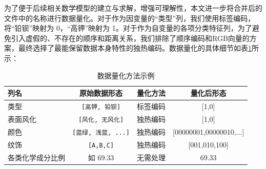 为了便于后续相关数学模型的建立与求解，增强可理解性，本文进一步将合并后的文件中的名称进行数据量化。对于作为因变量的“类型”列，我们使用标签编码，将“铅钡”映射为 0，“高钾”映射为 1。对于作为自变量的各项分类特征列，为了避免引入虚假的、不存在的顺序和距离关系，我们排除了顺序编码和RGB向量的方案，最终选择了最能保留数据本身特性的独热编码。数据量化的具体细节如表\ref{tab:quantification_example}所示：
\begin{table}[h!]
	\centering
	\caption{数据量化方法示例}
	\label{tab:quantification_example}
	\renewcommand{\arraystretch}{1.5} %
	\begin{tabular}{lccc}
		\toprule
		\textbf{列名} & \textbf{原始数据形态}               & \textbf{量化方法} & \textbf{量化后形态}                                \\
		\midrule
		\rowcolor{gray!20}
		类型          & \texttt{[高钾, 铅钡]}         & 标签编码          & [1,0]                        \\
		表面风化        & \texttt{[风化, 无风化]}        & 独热编码          & [1,0] \\
		\rowcolor{gray!20}
		颜色          & \texttt{[蓝绿, 浅蓝, ...]}    & 独热编码          & [00000001,00000010,...] \\
		纹饰          & \texttt{[A,B,C]} & 独热编码          & [001,010,100] \\
				\rowcolor{gray!20}
		各类化学成分比例    & 如 69.33                       & 无需处理          & 69.33                                         \\
		\bottomrule
	\end{tabular}
\end{table}

